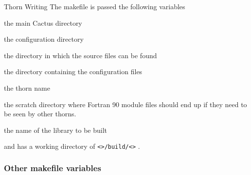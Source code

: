 \begin{cactuspart}{Thorn Writing}
The makefile is passed the following variables
\begin{Lentry}

\item [\texttt{\$(CCTK\_HOME)}]  the main Cactus directory

\item [\texttt{\$(TOP)}] the configuration directory

\item [\texttt{\$(SRCDIR)}] the directory in which the source files can be found

\item [\texttt{\$(CONFIG)}]  the directory containing the configuration files

\item [\texttt{\$(THORN)}]   the thorn name

\item [\texttt{\$(SCRATCH\_BUILD)}]  the scratch directory where Fortran 90 module
files should end up if they need to be seen by other thorns.

\item [\texttt{\$(NAME)}] the name of the library to be built

\end{Lentry}

and has a working directory of
\texttt{<>/build/<>} .

\subsubsection{Other makefile variables}


\end{cactuspart}
